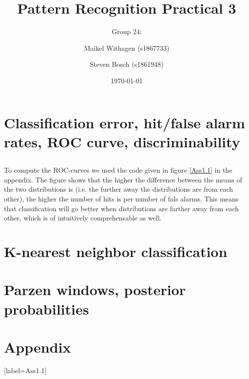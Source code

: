 \documentclass[10pt]{article}
\title{Pattern Recognition Practical 3}
\author{Group 24: \and Maikel Withagen (s1867733) \and Steven Bosch (s1861948)}
\date{\today}
\begin{document}
\maketitle

\section{Classification error, hit/false alarm rates, ROC curve, discriminability}
\subsection{}
To compute the ROC-curves we used the code given in figure \ref{Ass1.1} in the appendix. The figure shows that the higher the difference between the means of the two distributions is (i.e. the further away the distributions are from each other), the higher the number of hits is per number of fals alarms. This means that classification will go better when distributions are farther away from each other, which is of intuitively comprehensable as well.


\section{K-nearest neighbor classification}
\section{Parzen windows, posterior probabilities}

\section*{Appendix}
[label={Ass1.1}]
\end{document}
